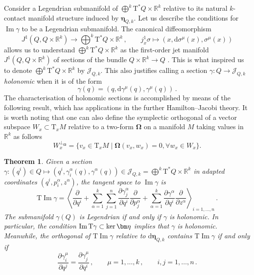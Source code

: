 \documentclass[11pt,twoside]{article}
\theoremstyle{plain}
\newtheorem{theorem}{Theorem}[section]
\theoremstyle{definition}
\theoremstyle{remark}
\newcommand{\R}{\mathbb{R}}
\newcommand{\dd}{\mathrm{d}}
\newcommand{\T}{\mathrm{T}}
\newcommand{\cT}{\mathrm{T}^\ast}
\DeclareMathOperator{\Ima}{Im}
\begin{document}
Consider a Legendrian submanifold of $\bigoplus ^k\cT Q\times \R^k$ relative to its natural $k$-contact manifold structure induced by $\bm\eta_{Q,k}$. Let us describe the conditions for $\Ima\gamma$ to be a  Legendrian submanifold. 
The canonical diffeomorphism
$$ \textstyle J^1(Q,Q\times \mathbb{R}^k) \longrightarrow \bigoplus ^k\cT Q\times \mathbb{R}^k\,, \qquad  j^1_x\sigma\longmapsto (x,\dd \sigma^\mu(x),\sigma^\mu(x)) $$
allows us to understand $\bigoplus ^k\cT Q\times \mathbb{R}^k$  as the first-order jet manifold $J^1(Q,Q\times \mathbb{R}^k)$ of sections of the bundle $Q\times \mathbb{R}^k\rightarrow Q$ \cite{OLV_86}. This is what inspired us to denote \(\bigoplus^k\T^*Q\times \mathbb{R}^k\) by \(\mathcal{J}_{Q,k}\). This also justifies calling a section \(\gamma\colon Q\rightarrow \mathcal{J}_{Q,k}\) {\it holonomic} when it is of the form
$$
\gamma(q)=(q,\dd\gamma^\mu(q),\gamma^\mu(q))\,.
$$
The characterisation of holonomic sections is accomplished by means of the following result, which has applications in the further Hamilton--Jacobi theory. It is worth noting that one can also define the symplectic orthogonal of a vector subspace $W_x\subset \T_xM$ relative to a two-form $\bm\Omega$ on a manifold $M$ taking values in $\mathbb{R}^k$ as follows
$$
W_x^{\perp_{\bm\Omega}}=\{v_x\in \T_xM\mid\bm\Omega(v_x,w_x)=0,\forall w_x\in W_x\}.
$$

\begin{theorem}\label{thm:k-coisotropic-condition}
    Given a section $\gamma\colon \left(q^i\right) \in Q  \mapsto \left(q^i,\gamma_i^\alpha(q), \gamma^\alpha(q) \right)\in\mathcal{J}_{Q,k}=\bigoplus^k\cT Q\times \R^k$ in adapted coordinates \((q^i,p_i^\alpha,z^\alpha)\), the tangent space to $\Ima \gamma$ is 
        \[
\T\Ima\gamma
=
\left\langle
\frac{\partial}{\partial q^i}
+
\sum_{\alpha=1}^k \sum_{j=1}^n
\frac{\partial \gamma^\alpha_j}{\partial q^i}
\frac{\partial}{\partial p^\alpha_j}
+
\sum_{\alpha=1}^k
\frac{\partial \gamma^\alpha}{\partial q^i}
\frac{\partial}{\partial z^\alpha}
\right\rangle_{i=1,\dotsc,n}\,.
\]
The submanifold $\gamma(Q)$ is Legendrian if and only if $\gamma$ is holonomic. In particular, the condition \({\rm Im}\,\T\gamma\subset \ker \bm \eta\) implies that \(\gamma\) is holonomic. Meanwhile,  the orthogonal of $\T\!\Ima \gamma$ relative to $\dd \bm\eta_{Q,k}$ contains $\T\!\Ima\gamma$ if and only if  
$$
\frac{\partial \gamma^\mu_i}{\partial q^j} = \frac{\partial \gamma^\mu_j}{\partial q^i}\,, \qquad \mu=1,\dotsc,k\,, \qquad i,j =1, \dotsc, n\,.
$$
\end{theorem}
\end{document}

